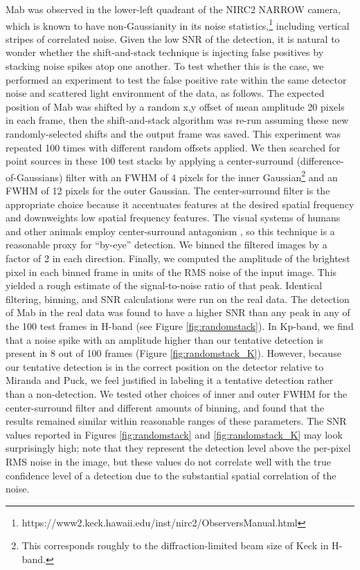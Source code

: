 \documentclass[preprint]{aastex631}
\begin{document}
Mab was observed in the lower-left quadrant of the NIRC2 NARROW camera, which is known to have non-Gaussianity in its noise statistics,\footnote{https://www2.keck.hawaii.edu/inst/nirc2/ObserversManual.html} including vertical stripes of correlated noise. Given the low SNR of the detection, it is natural to wonder whether the shift-and-stack technique is injecting false positives by stacking noise spikes atop one another. To test whether this is the case, we performed an experiment to test the false positive rate within the same detector noise and scattered light environment of the data, as follows. The expected position of Mab was shifted by a random x,y offset of mean amplitude 20 pixels in each frame, then the shift-and-stack algorithm was re-run assuming these new randomly-selected shifts and the output frame was saved. This experiment was repeated 100 times with different random offsets applied. We then searched for point sources in these 100 test stacks by applying a center-surround (difference-of-Gaussians) filter with an FWHM of 4 pixels for the inner Gaussian\footnote{This corresponds roughly to the diffraction-limited beam size of Keck in H-band.} and an FWHM of 12 pixels for the outer Gaussian. The center-surround filter is the appropriate choice because it accentuates features at the desired spatial frequency and downweights low spatial frequency features. The visual systems of humans and other animals employ center-surround antagonism \citep{graham06}, so this technique is a reasonable proxy for ``by-eye'' detection. We binned the filtered images by a factor of 2 in each direction. Finally, we computed the amplitude of the brightest pixel in each binned frame in units of the RMS noise of the input image. This yielded a rough estimate of the signal-to-noise ratio of that peak. Identical filtering, binning, and SNR calculations were run on the real data. The detection of Mab in the real data was found to have a higher SNR than any peak in any of the 100 test frames in H-band (see Figure \ref{fig:randomstack}). In Kp-band, we find that a noise spike with an amplitude higher than our tentative detection is present in 8 out of 100 frames (Figure \ref{fig:randomstack_K}). However, because our tentative detection is in the correct position on the detector relative to Miranda and Puck, we feel justified in labeling it a tentative detection rather than a non-detection. We tested other choices of inner and outer FWHM for the center-surround filter and different amounts of binning, and found that the results remained similar within reasonable ranges of these parameters. The SNR values reported in Figures \ref{fig:randomstack} and \ref{fig:randomstack_K} may look surprisingly high; note that they represent the detection level above the per-pixel RMS noise in the image, but these values do not correlate well with the true confidence level of a detection due to the substantial spatial correlation of the noise.
\end{document}
